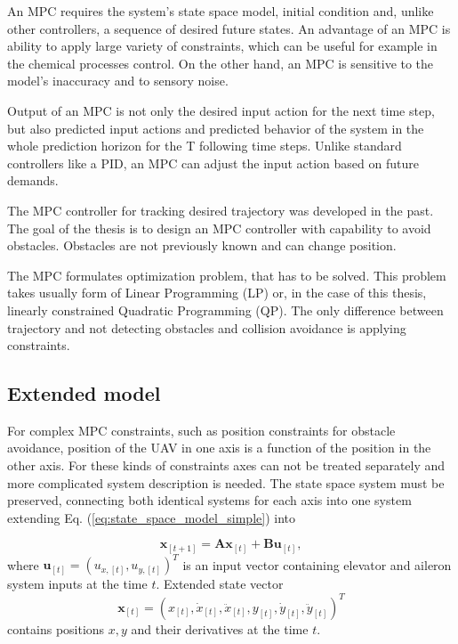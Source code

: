 \documentclass[a4paper,11pt,titlepage]{article}
\begin{document}
An MPC requires the system's state space model, initial condition and, unlike other controllers, a sequence of desired future states. An advantage of an MPC is ability to apply large variety of constraints, which can be useful for example in the chemical processes control. On the other hand, an MPC is sensitive to the model's inaccuracy and to sensory noise. 

Output of an MPC is not only the desired input action for the next time step, but also predicted input actions and predicted behavior of the system in the whole prediction horizon for the T following time steps. Unlike standard controllers like a PID, an MPC can adjust the input action based on future demands.

The MPC controller for tracking desired trajectory was developed \cite{tomas} in the past. The goal of the thesis is to design an MPC controller with capability to avoid obstacles. Obstacles are not previously known and can change position.

The MPC formulates optimization problem, that has to be solved. This problem takes usually form of Linear Programming (LP) or, in the case of this thesis, linearly constrained Quadratic Programming (QP). The only difference between trajectory and not detecting obstacles and collision avoidance is applying constraints.



\subsection{Extended model}		%
For complex MPC constraints, such as position constraints for obstacle avoidance, position of the UAV in one axis is a function of the position in the other axis. For these kinds of constraints axes can not be treated separately and more complicated system description is needed. The state space system must be preserved, connecting both identical systems for each axis into one system extending Eq. (\ref{eq:state_space_model_simple}) into 

\begin{equation}
\label{eq:state_space_model_simple}
\textbf{x}_{[t+1]} = \textbf{A} \textbf{x}_{[t]} +\textbf{B} \textbf{u}_{[t]},
\end{equation}
where $\textbf{u}_{[t]} = (u_{x,[t]}, u_{y,[t]})^T$ is an input vector containing elevator and aileron system inputs at the time $t$. Extended state vector 
\begin{equation}
\textbf{x}_{[t]} = (x_{[t]}, \dot{x}_{[t]}, \ddot{x}_{[t]}, y_{[t]}, \dot{y}_{[t]}, \ddot{y}_{[t]})^T
\end{equation}
contains positions $x,y$ and their derivatives at the time $t$. 
\end{document}
